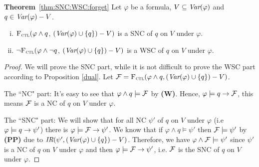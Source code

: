 \documentclass{article}
\begin{document}
 \noindent\textbf{Theorem}~\ref{thm:SNC:WSC:forget} Let $\varphi$ be a formula, $V\subseteq\textit{Var}(\varphi)$ and $q\in\textit{Var}(\varphi)- V$.
  \begin{enumerate}[(i)]
   \item ${\textsc{F}_{\textsc{ctl}}} (\varphi \land q$, $(\textit{Var}(\varphi) \cup \{q\})- V)$
   is a SNC of $q$ on $V$ under $\varphi$.
   \item  $\neg{\textsc{F}_{\textsc{ctl}}} (\varphi \land \neg q$, $(\textit{Var}(\varphi) \cup \{q\})- V)$
   is a WSC of $q$ on $V$ under $\varphi$.
  \end{enumerate}
 \begin{proof}
  We will prove the SNC part, while it is not difficult to prove the WSC part according to Proposition \ref{dual}.
  Let ${\cal F}={\textsc{F}_{\textsc{ctl}}}(\varphi \wedge q, (\textit{Var}(\varphi) \cup \{q\})- V)$.

   The ``NC" part: It's easy to see that $\varphi \wedge q \models {\cal F}$ by {\bfseries (W)}. Hence, $\varphi\models q \rightarrow {\cal F}$, this means
   ${\cal F}$ is a NC of $q$ on $V$ under $\varphi$.





     The ``SNC" part: We will show that for all NC $\psi'$ of $q$ on $V$ under $\varphi$ (i.e $\varphi\models q \rightarrow \psi'$) there is $\varphi \models {\cal F} \rightarrow \psi'$.
    We know that if $\varphi \wedge q \models \psi'$ then ${\cal F} \models \psi'$ by {\bfseries (PP)} due to $\emph{IR}(\psi', (\textit{Var}(\varphi) \cup \{q\})- V)$. Therefore, we have $\varphi \wedge {\cal F} \models \psi'$ since $\psi'$ is a NC of $q$ on $V$ under $\varphi$ and then $\varphi \models {\cal F} \rightarrow \psi'$, i.e.  ${\cal F}$ is the SNC of $q$ on $V$ under $\varphi$.
  \end{proof}
\end{document}
